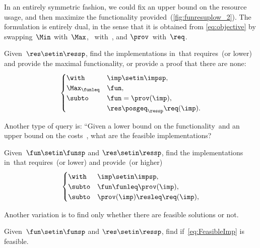 In an entirely symmetric fashion, we could fix an upper bound on the resource usage, and then maximize the functionality provided~(\cref{fig:funresuplow_2}).
The formulation is entirely dual, in the sense that it is obtained from \cref{eq:objective} by swapping~$\Min$ with~$\Max$, \funsp~with~\ressp, and $\prov$~with~$\req$.

\begin{problem}[\FixResMaxFun]
\label{prob:FixResMaxFun}
Given~$\res\setin\ressp$, find the implementations in~\impsp that requires~\res (or lower) and provide the maximal functionality, or provide a proof that there are none:
\begin{equation}
    \begin{cases}
        \with          & \imp\setin\impsp,               \\
        \Max_{\funleq} & \fun,                           \\
        \subto         & \fun=\prov(\imp),               \\
                       & \res\posgeq_{\ressp}\req(\imp).
    \end{cases}\label{eq:objective-1}
\end{equation}
\end{problem}


\begin{figure*}
    \centering
    \caption{}
    \label{fig:funresuplow_2}
\end{figure*}

Another type of query is: ``Given a lower bound on the functionality~\fun and an upper bound on the costs~\fun, what are the feasible implementations?

\begin{problem}[\FeasibleImp]
\label{prob:FeasibleImp}
Given~$\fun\setin\funsp$ and $\res\setin\ressp$, find the implementations in~\impsp that requires~\res (or lower) and provide~\fun (or higher)
\begin{equation}
    \label{eq:FeasibleImp}
    \begin{cases}
        \with  & \imp\setin\impsp,               \\
        \subto & \fun \funleq \prov(\imp),       \\
        \subto & \prov(\imp) \resleq \req(\imp), \\
    \end{cases}
\end{equation}
\end{problem}

Another variation is to find only whether there are feasible solutions or not.

\begin{problem}[\Feasibility]
\label{prob:Feasibility}
Given~$\fun\setin\funsp$ and $\res\setin\ressp$, find if~\cref{eq:FeasibleImp} is feasible.
\end{problem}
